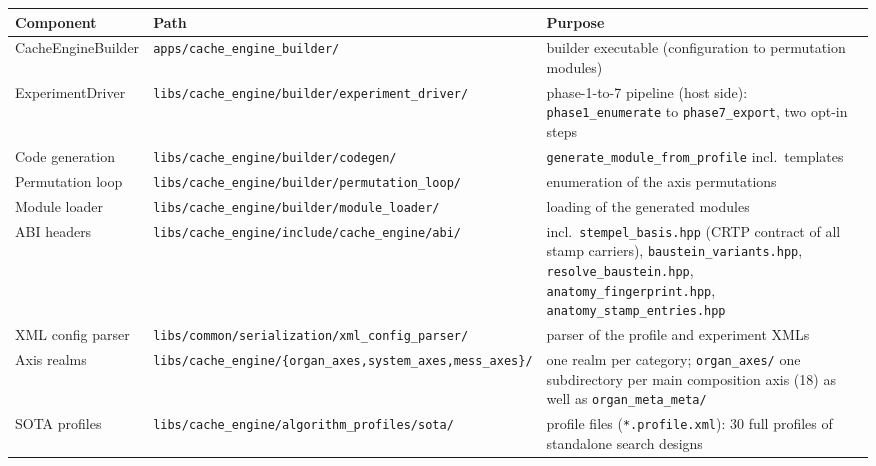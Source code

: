 {\small
\begin{longtable}{@{}>{\raggedright\arraybackslash}p{}>{\raggedright\arraybackslash}p{}>{\raggedright\arraybackslash}p{}@{}}
\toprule
\textbf{Component} & \textbf{Path} & \textbf{Purpose} \\
\midrule
\endhead%
\midrule
\endfoot%
\bottomrule
\endlastfoot%
CacheEngineBuilder &
\texttt{apps/\allowbreak{}cache\_engine\_builder/} &
builder executable (configuration to permutation modules) \\
ExperimentDriver &
\texttt{libs/\allowbreak{}cache\_engine/\allowbreak{}builder/\allowbreak{}experiment\_driver/} &
phase-1-to-7 pipeline (host side): \texttt{phase1\_\allowbreak{}enumerate} to
\texttt{phase7\_\allowbreak{}export}, two opt-in steps \\
Code generation &
\texttt{libs/\allowbreak{}cache\_engine/\allowbreak{}builder/\allowbreak{}codegen/} &
\texttt{generate\_\allowbreak{}module\_\allowbreak{}from\_\allowbreak{}profile} incl.\ templates \\
Permutation loop &
\texttt{libs/\allowbreak{}cache\_engine/\allowbreak{}builder/\allowbreak{}permutation\_loop/} &
enumeration of the axis permutations \\
Module loader &
\texttt{libs/\allowbreak{}cache\_engine/\allowbreak{}builder/\allowbreak{}module\_loader/} &
loading of the generated modules \\
ABI headers &
\texttt{libs/\allowbreak{}cache\_engine/\allowbreak{}include/\allowbreak{}cache\_engine/\allowbreak{}abi/} &
incl.\ \texttt{stempel\_\allowbreak{}basis.hpp} (CRTP contract of all stamp carriers),
\texttt{baustein\_\allowbreak{}variants.hpp}, \texttt{resolve\_\allowbreak{}baustein.hpp},
\texttt{anatomy\_\allowbreak{}fingerprint.hpp}, \texttt{anatomy\_\allowbreak{}stamp\_\allowbreak{}entries.hpp} \\
XML config parser &
\texttt{libs/\allowbreak{}common/\allowbreak{}serialization/\allowbreak{}xml\_config\_parser/} &
parser of the profile and experiment XMLs \\
Axis realms &
\texttt{libs/\allowbreak{}cache\_engine/\allowbreak{}\{organ\_axes,\allowbreak{}system\_axes,\allowbreak{}mess\_axes\}/} &
one realm per category; \texttt{organ\_\allowbreak{}axes/} one subdirectory per main composition axis
(18) as well as \texttt{organ\_\allowbreak{}meta\_\allowbreak{}meta/} \\
SOTA profiles &
\texttt{libs/\allowbreak{}cache\_engine/\allowbreak{}algorithm\_profiles/\allowbreak{}sota/} &
33 profile files (\texttt{*.profile.xml}): 30 full profiles of standalone search designs

\end{longtable}}
